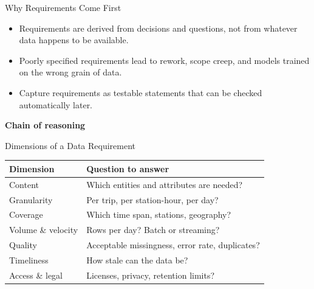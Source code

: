 \documentclass[aspectratio=43,11pt]{beamer}
\begin{document}
\begin{frame}{Why Requirements Come First}
  \begin{itemize}
    \item Requirements are derived from \alert{decisions and questions}, not
      from whatever data happens to be available.
    \item Poorly specified requirements lead to rework, scope creep, and
      models trained on the wrong grain of data.
    \item Capture requirements as testable statements that can be checked
      automatically later.
  \end{itemize}

  \medskip
  \textbf{Chain of reasoning}

  \medskip
\end{frame}

\begin{frame}{Dimensions of a Data Requirement}
  \small
  \begin{tabular}{@{}p{3.0cm}p{7.1cm}@{}}
    \toprule
    \textbf{Dimension} & \textbf{Question to answer} \\
    \midrule
    Content & Which entities and attributes are needed? \\
    Granularity & Per trip, per station-hour, per day? \\
    Coverage & Which time span, stations, geography? \\
    Volume \& velocity & Rows per day? Batch or streaming? \\
    Quality & Acceptable missingness, error rate, duplicates? \\
    Timeliness & How stale can the data be? \\
    Access \& legal & Licenses, privacy, retention limits? \\
    \bottomrule
  \end{tabular}
\end{frame}
\end{document}
